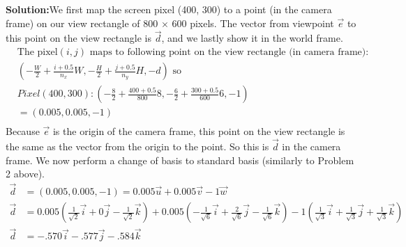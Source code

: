 \documentclass[a4paper, 12pt]{article}
\begin{document}
\begin{enumerate}
        \textbf{Solution:}We first map the screen pixel (400, 300) to a point (in the camera frame) on our view rectangle of 800 $\times$ 600 pixels. The vector from viewpoint $\vec{e}$ to this point on the view rectangle is $\vec{d}$, and we lastly show it in the world frame.
    \begin{align*}
        &\text{The pixel$(i, j)$ maps to following point on the view rectangle (in camera frame):}\\
        &\left( -\frac{W}{2} + \frac{i + 0.5}{n_x}W, -\frac{H}{2} + \frac{j + 0.5}{n_y}H, -d \right) \text{ so}\\
        &Pixel(400, 300) : \left( -\frac{8}{2} + \frac{400 + 0.5}{800}8, -\frac{6}{2} + \frac{300 + 0.5}{600}6, -1 \right)\\
        &= (0.005, 0.005, -1)\\
    \end{align*}
        Because $\vec{e}$ is the origin of the camera frame, this point on the view rectangle is the same as the vector from the origin to the point. So this is $\vec{d}$ in the camera frame. We now perform a change of basis to standard basis (similarly to Problem 2 above).
        \begin{align*}
            \vec{d} &= (0.005, 0.005, -1) = 0.005\vec{u} + 0.005\vec{v} - 1\vec{w}\\
            \vec{d} &= 0.005\left( \frac{1}{\sqrt{2}}\vec{i} + 0\vec{j} -\frac{1}{\sqrt{2}}\vec{k} \right) + 0.005\left(-\frac{1}{\sqrt{6}}\vec{i} + \frac{2}{\sqrt{6}}\vec{j} -\frac{1}{\sqrt{6}}\vec{k} \right) - 1\left( \frac{1}{\sqrt{3}}\vec{i} + \frac{1}{\sqrt{3}}\vec{j} + \frac{1}{\sqrt{3}}\vec{k} \right)\\
            \vec{d} &= -.570\vec{i} - .577\vec{j} -.584\vec{k}\\
    \end{align*}


\end{enumerate}
\end{document}
